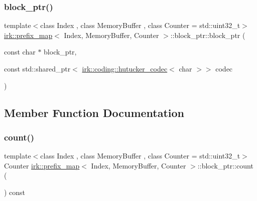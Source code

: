 \subsubsection{\texorpdfstring{block\+\_\+ptr()}{block\_ptr()}}
{\footnotesize\ttfamily template$<$class Index , class Memory\+Buffer , class Counter  = std\+::uint32\+\_\+t$>$ \\
\mbox{\hyperlink{classirk_1_1prefix__map}{irk\+::prefix\+\_\+map}}$<$ Index, Memory\+Buffer, Counter $>$\+::block\+\_\+ptr\+::block\+\_\+ptr (\begin{DoxyParamCaption}\item[{const char $\ast$}]{block\+\_\+ptr,  }\item[{const std\+::shared\+\_\+ptr$<$ \mbox{\hyperlink{classirk_1_1coding_1_1hutucker__codec}{irk\+::coding\+::hutucker\+\_\+codec}}$<$ char $>$$>$}]{codec }\end{DoxyParamCaption})\hspace{0.3cm}{\ttfamily [inline]}}



\subsection{Member Function Documentation}
\mbox{\label{classirk_1_1prefix__map_1_1block__ptr_a98fc3e949cae9309b0b621bfa1854c70}} 
\subsubsection{\texorpdfstring{count()}{count()}}
{\footnotesize\ttfamily template$<$class Index , class Memory\+Buffer , class Counter  = std\+::uint32\+\_\+t$>$ \\
Counter \mbox{\hyperlink{classirk_1_1prefix__map}{irk\+::prefix\+\_\+map}}$<$ Index, Memory\+Buffer, Counter $>$\+::block\+\_\+ptr\+::count (\begin{DoxyParamCaption}{ }\end{DoxyParamCaption}) const\hspace{0.3cm}{\ttfamily [inline]}}

\mbox{\label{classirk_1_1prefix__map_1_1block__ptr_a501892be0f2a245b8982045c3d3febc1}} 
